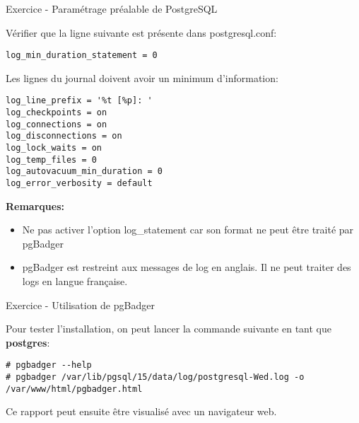 \begin{frame}[fragile]{Exercice - Paramétrage préalable de PostgreSQL}

   Vérifier que la ligne suivante est présente dans postgresql.conf:

\begin{tiny}
\begin{Verbatim}[commandchars=\\\{\}]
log_min_duration_statement = 0
\end{Verbatim}
\end{tiny}

Les lignes du journal doivent avoir un minimum d'information:

\begin{tiny}
\begin{Verbatim}[commandchars=\\\{\}]
log_line_prefix = '%t [%p]: '
log_checkpoints = on
log_connections = on
log_disconnections = on
log_lock_waits = on
log_temp_files = 0
log_autovacuum_min_duration = 0
log_error_verbosity = default
\end{Verbatim}
\end{tiny}

   \textbf{Remarques:}
\begin{itemize}
   \item Ne pas activer l'option log\_statement car son format ne peut être traité par pgBadger
   \item pgBadger est restreint aux messages de log en anglais. Il ne peut traiter des logs en langue française.
\end{itemize}

\end{frame}


\begin{frame}[fragile]{Exercice - Utilisation de pgBadger}

Pour tester l'installation, on peut lancer la commande suivante en tant que \textbf{postgres}:

\begin{tiny}
\begin{Verbatim}[commandchars=\\\{\}]
# pgbadger --help
# pgbadger /var/lib/pgsql/15/data/log/postgresql-Wed.log -o /var/www/html/pgbadger.html
\end{Verbatim}
\end{tiny}

Ce rapport peut ensuite être visualisé avec un navigateur web.

\end{frame}

